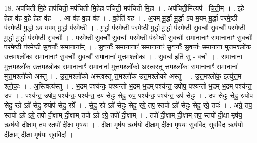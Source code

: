 \documentclass[17pt]{extarticle}
\begin{document}
18. अप॑चिती मि॒हे हाप॑चिती॒ मप॑चिती मि॒हेहा प॑चिती॒ मप॑चिती मि॒हा । . अप॑चिती॒मित्यप॑ - चि॒ती॒म् । . इ॒हे हेहा व॑ह व॒हे हेहा व॑ह । . आ व॑ह व॒हा व॑ह । . व॒हेति॑ वह । . अ॒यम् मू॒र्द्धा मू॒र्द्धा ऽय म॒यम् मू॒र्द्धा प॑रमे॒ष्ठी प॑रमे॒ष्ठी मू॒र्द्धा ऽय म॒यम् मू॒र्द्धा प॑रमे॒ष्ठी । . मू॒र्द्धा प॑रमे॒ष्ठी प॑रमे॒ष्ठी मू॒र्द्धा मू॒र्द्धा प॑रमे॒ष्ठी सु॒वर्चाः᳚ सु॒वर्चाः᳚ परमे॒ष्ठी मू॒र्द्धा मू॒र्द्धा प॑रमे॒ष्ठी सु॒वर्चाः᳚ । . प॒र॒मे॒ष्ठी सु॒वर्चाः᳚ सु॒वर्चाः᳚ परमे॒ष्ठी प॑रमे॒ष्ठी सु॒वर्चाः᳚ समा॒नानाꣳ॑ समा॒नानाꣳ॑ सु॒वर्चाः᳚ परमे॒ष्ठी प॑रमे॒ष्ठी सु॒वर्चाः᳚ समा॒नाना᳚म् । . सु॒वर्चाः᳚ समा॒नानाꣳ॑ समा॒नानाꣳ॑ सु॒वर्चाः᳚ सु॒वर्चाः᳚ समा॒नाना॑ मुत्त॒मश्लो॑क उत्त॒मश्लो॑कः समा॒नानाꣳ॑ सु॒वर्चाः᳚ सु॒वर्चाः᳚ समा॒नाना॑ मुत्त॒मश्लो॑कः । . सु॒वर्चा॒ इति॑ सु - वर्चाः᳚ । . स॒मा॒नाना॑ मुत्त॒मश्लो॑क उत्त॒मश्लो॑कः समा॒नानाꣳ॑ समा॒नाना॑ मुत्त॒मश्लो॑को अस्त्वस्तू त्त॒मश्लो॑कः समा॒नानाꣳ॑ समा॒नाना॑ मुत्त॒मश्लो॑को अस्तु । . उ॒त्त॒मश्लो॑को अस्त्वस्तू त्त॒मश्लो॑क उत्त॒मश्लो॑को अस्तु । . उ॒त्त॒मश्लो॑क॒ इत्यु॑त्त॒म - श्लो॒कः॒ । . अ॒स्त्वित्य॑स्तु । . भ॒द्रम् पश्य॑न्तः॒ पश्य॑न्तो भ॒द्रम् भ॒द्रम् पश्य॑न्त॒ उपोप॒ पश्य॑न्तो भ॒द्रम् भ॒द्रम् पश्य॑न्त॒ उप॑ । . पश्य॑न्त॒ उपोप॒ पश्य॑न्तः॒ पश्य॑न्त॒ उप॑ सेदुः सेदु॒ रुप॒ पश्य॑न्तः॒ पश्य॑न्त॒ उप॑ सेदुः । . उप॑ सेदुः सेदु॒ रुपोप॑ सेदु॒ रग्रे ऽग्रे॑ सेदु॒ रुपोप॑ सेदु॒ रग्रे᳚ । . से॒दु॒ रग्रे ऽग्रे॑ सेदुः सेदु॒ रग्रे॒ तप॒ स्तपो ऽग्रे॑ सेदुः सेदु॒ रग्रे॒ तपः॑ । . अग्रे॒ तप॒ स्तपो ऽग्रे ऽग्रे॒ तपो॑ दी॒क्षाम् दी॒क्षाम् तपो ऽग्रे ऽग्रे॒ तपो॑ दी॒क्षाम् । . तपो॑ दी॒क्षाम् दी॒क्षाम् तप॒ स्तपो॑ दी॒क्षा मृष॑य॒ ऋष॑यो दी॒क्षाम् तप॒ स्तपो॑ दी॒क्षा मृष॑यः । . दी॒क्षा मृष॑य॒ ऋष॑यो दी॒क्षाम् दी॒क्षा मृष॑यः सुव॒र्विदः॑ सुव॒र्विद॒ ऋष॑यो दी॒क्षाम् दी॒क्षा मृष॑यः सुव॒र्विदः॑ । \newline
\end{document}
